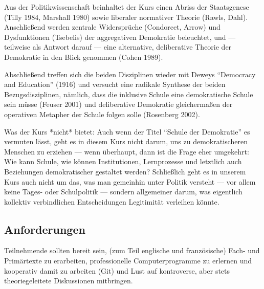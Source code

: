 Aus der Politikwissenschaft beinhaltet der Kurs einen Abriss der Staatsgenese (Tilly 1984, Marshall 1980) sowie liberaler normativer Theorie (Rawls, Dahl).
Anschließend werden zentrale Widersprüche (Condorcet, Arrow) und Dysfunktionen (Tsebelis) der aggregativen Demokratie beleuchtet, und --- teilweise als Antwort darauf --- eine alternative, deliberative Theorie der Demokratie in den Blick genommen (Cohen 1989).

Abschließend treffen sich die beiden Disziplinen wieder mit Deweys ``Democracy and Education'' (1916) und versucht eine radikale Synthese der beiden Bezugsdisziplinen, nämlich, dass die inklusive Schule eine demokratische Schule sein müsse (Feuser 2001) und deliberative Demokratie gleichermaßen der operativen Metapher der Schule folgen solle (Rosenberg 2002).

Was der Kurs *nicht* bietet:
Auch wenn der Titel ``Schule der Demokratie'' es vermuten lässt, geht es in diesem Kurs nicht darum, uns zu demokratischeren Menschen zu erziehen --- wenn überhaupt, dann ist die Frage eher umgekehrt:
Wie kann Schule, wie können Institutionen, Lernprozesse und letztlich auch Beziehungen demokratischer gestaltet werden? Schließlich geht es in unserem Kurs auch nicht um das, was man gemeinhin unter Politik versteht --- vor allem keine Tages- oder Schulpolitik --- sondern allgemeiner darum, was eigentlich kollektiv verbindlichen Entscheidungen Legitimität verleihen könnte.


\subsection{Anforderungen}

Teilnehmende sollten bereit sein, (zum Teil englische und französische) Fach- und Primärtexte zu erarbeiten, professionelle Computerprogramme zu erlernen und kooperativ damit zu arbeiten (Git) und Lust auf kontroverse, aber stets theoriegeleitete Diskussionen mitbringen.
